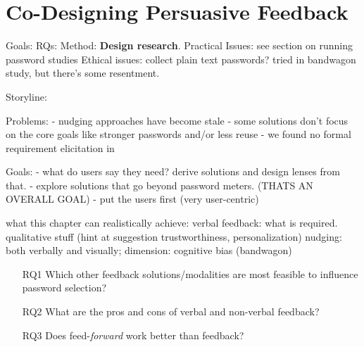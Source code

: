\chapter[Co-Designing Persuasive Feedback] {Co-Designing Persuasive Feedback}\label{chap:feedback_modalities}



Goals: 
RQs:
Method: \textbf{Design research}.
Practical Issues: see section on running password studies
Ethical issues: collect plain text passwords? tried in bandwagon study, but there's some resentment. 


Storyline:

Problems:
- nudging approaches have become stale
- some solutions don't focus on the core goals like stronger passwords and/or less reuse
- we found no formal requirement elicitation in 


Goals:
- what do users say they need? derive solutions and design lenses from that. 
- explore solutions that go beyond password meters. (THATS AN OVERALL GOAL)
- put the users first (very user-centric)


% 

what this chapter can realistically achieve: 
verbal feedback: what is required. qualitative stuff (hint at suggestion trustworthiness, personalization)
nudging: both verbally and visually; dimension: cognitive bias (bandwagon)

\begin{itemize}
	\item[RQ1] Which other feedback solutions/modalities are most feasible to influence password selection?
	\item[RQ2] What are the pros and cons of verbal and non-verbal feedback?
	\item[RQ3] Does feed-\textit{forward} work better than feedback?
\end{itemize}

